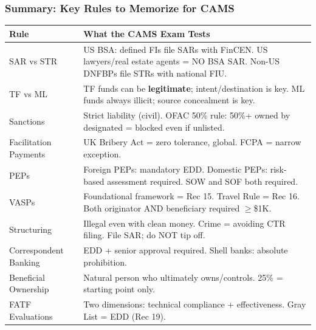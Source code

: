 \documentclass[12pt,aspectratio=169]{beamer}
\renewcommand{\scriptsize}{\fontsize{5}{6}\selectfont}
\newcommand{\keypoint}[1]{\textcolor{deepblue}{\textbf{#1}}}
\begin{document}
	\begin{frame}
		\frametitle{\fontsize{12}{14}\selectfont \textbf{Summary: Key Rules to Memorize for CAMS}}
		\vspace{0.1cm}
		\scriptsize
		\begin{longtable}{|p{}|p{}|}
			\hline
			\keypoint{Rule} & \keypoint{What the CAMS Exam Tests} \\
			\hline
			SAR vs STR & US BSA: defined FIs file SARs with FinCEN. US lawyers/real estate agents = NO BSA SAR. Non-US DNFBPs file STRs with national FIU. \\
			\hline
			TF vs ML & TF funds can be \textbf{legitimate}; intent/destination is key. ML funds always illicit; source concealment is key. \\
			\hline
			Sanctions & Strict liability (civil). OFAC 50\% rule: 50\%+ owned by designated = blocked even if unlisted. \\
			\hline
			Facilitation Payments & UK Bribery Act = zero tolerance, global. FCPA = narrow exception. \\
			\hline
			PEPs & Foreign PEPs: mandatory EDD. Domestic PEPs: risk-based assessment required. SOW and SOF both required. \\
			\hline
			VASPs & Foundational framework = Rec 15. Travel Rule = Rec 16. Both originator AND beneficiary required $\geq$\$1K. \\
			\hline
			Structuring & Illegal even with clean money. Crime = avoiding CTR filing. File SAR; do NOT tip off. \\
			\hline
			Correspondent Banking & EDD + senior approval required. Shell banks: absolute prohibition. \\
			\hline
			Beneficial Ownership & Natural person who ultimately owns/controls. 25\% = starting point only. \\
			\hline
			FATF Evaluations & Two dimensions: technical compliance + effectiveness. Gray List = EDD (Rec 19). \\
			\hline
		\end{longtable}
	\end{frame}
	
\end{document}
